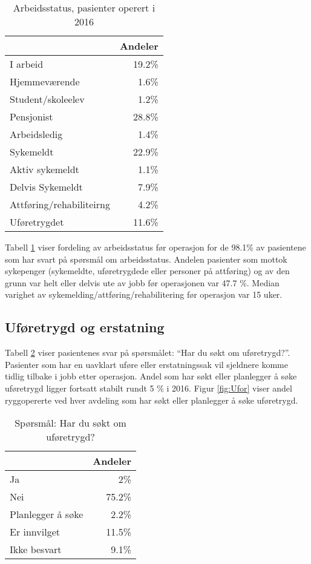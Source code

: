 \begin{table}[ht]
\centering
\begin{tabular}{lr}
  \hline
 & Andeler \\ 
  \hline
I arbeid & 19.2\% \\ 
  Hjemmeværende & 1.6\% \\ 
  Student/skoleelev & 1.2\% \\ 
  Pensjonist & 28.8\% \\ 
  Arbeidsledig & 1.4\% \\ 
  Sykemeldt & 22.9\% \\ 
  Aktiv sykemeldt & 1.1\% \\ 
  Delvis Sykemeldt & 7.9\% \\ 
  Attføring/rehabiliteirng & 4.2\% \\ 
  Uføretrygdet & 11.6\% \\ 
   \hline
\end{tabular}
\caption{Arbeidsstatus, pasienter operert i 2016} 
\label{tab:Arb}
\end{table}


Tabell \ref{tab:Arb} viser fordeling av arbeidsstatus før operasjon for de 98.1\% 
av pasientene som har svart på spørsmål om arbeidsstatus.
Andelen pasienter som mottok sykepenger (sykemeldte, uføretrygdede eller personer 
på attføring) og av den grunn var helt eller delvis ute av jobb før operasjonen var 
47.7 \%. 
Median varighet av sykemelding/attføring/rehabilitering  før operasjon var 
15 uker.




\subsection{Uføretrygd og erstatning }

Tabell \ref{tab:Ufor} viser pasientenes svar på spørsmålet: ``Har du søkt om uføretrygd?''.
Pasienter som har en uavklart uføre eller erstatningssak vil sjeldnere komme tidlig tilbake i jobb etter operasjon.
Andel som har søkt eller planlegger å søke uføretrygd ligger fortsatt stabilt rundt 5 \% i 2016. 
Figur \ref{fig:Ufor} viser andel ryggopererte ved hver avdeling som har søkt eller planlegger å søke uføretrygd.

\begin{table}[ht]
\centering
\begin{tabular}{lr}
  \hline
 & Andeler \\ 
  \hline
Ja & 2\% \\ 
  Nei & 75.2\% \\ 
  Planlegger å søke & 2.2\% \\ 
  Er innvilget & 11.5\% \\ 
  Ikke besvart & 9.1\% \\ 
   \hline
\end{tabular}
\caption{Spørsmål: Har du søkt om uføretrygd?} 
\label{tab:Ufor}
\end{table}



